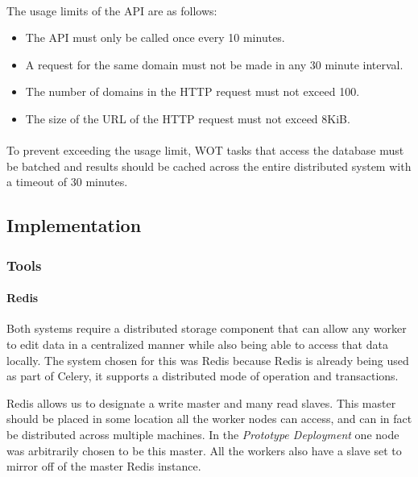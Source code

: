 \paragraph{}
The usage limits of the API are as follows\cite{wot-about}:

\begin{itemize}
    \item The API must only be called once every 10 minutes.
    \item A request for the same domain must not be made in any 30 minute interval.
    \item The number of domains in the HTTP request must not exceed 100.
    \item The size of the URL of the HTTP request must not exceed 8KiB.
\end{itemize}

\paragraph{}
To prevent exceeding the usage limit, WOT tasks that access the database must be batched and results should be cached across the entire distributed system with a timeout of 30 minutes.


\subsection{Implementation}
\subsubsection{Tools}
\paragraph{Redis}
Both systems require a distributed storage component that can allow any worker to edit data in a centralized manner while also being able to access that data locally. The system chosen for this was Redis\cite{redis} because Redis is already being used as part of Celery, it supports a distributed mode of operation and transactions.

Redis allows us to designate a write master and many read slaves. This master should be placed in some location all the worker nodes can access, and can in fact be distributed across multiple machines.  In the \emph{Prototype Deployment} one node was arbitrarily chosen to be this master. All the workers also have a slave set to mirror off of the master Redis instance.

